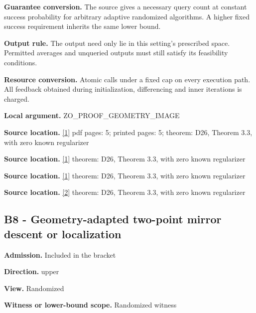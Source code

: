 \documentclass[10pt,a4paper]{article}
\begin{document}
\textbf{Guarantee conversion.} The source gives a necessary query count at constant success probability for arbitrary adaptive randomized algorithms. A higher fixed success requirement inherits the same lower bound.



\textbf{Output rule.} The output need only lie in this setting's prescribed space. Permitted averages and unqueried outputs must still satisfy its feasibility conditions.



\textbf{Resource conversion.} Atomic calls under a fixed cap on every execution path. All feedback obtained during initialization, differencing and inner iterations is charged.



\textbf{Local argument.} ZO\_PROOF\_GEOMETRY\_IMAGE



\textbf{Source location.} \href{https://arxiv.org/html/2610.00345v1}{[1]} pdf pages: 5; printed pages: 5; theorem: D26, Theorem 3.3, with zero known regularizer



\textbf{Source location.} \href{https://arxiv.org/html/2610.00345v1}{[1]} theorem: D26, Theorem 3.3, with zero known regularizer



\textbf{Source location.} \href{https://arxiv.org/html/2610.00345v1}{[1]} theorem: D26, Theorem 3.3, with zero known regularizer



\textbf{Source location.} \href{https://arxiv.org/html/2607.16558v2}{[2]} theorem: D26, Theorem 3.3, with zero known regularizer



\subsection{B8 - Geometry-adapted two-point mirror descent or localization}


\textbf{Admission.} Included in the bracket



\textbf{Direction.} upper



\textbf{View.} Randomized



\textbf{Witness or lower-bound scope.} Randomized witness
\end{document}
